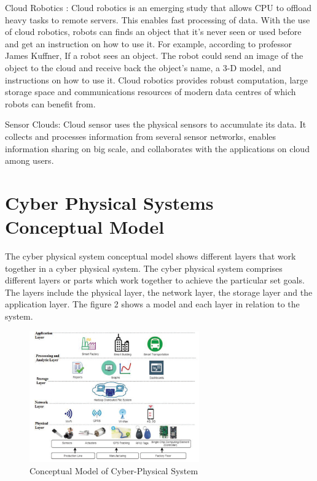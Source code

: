 \documentclass[english]{lni}
\begin{document}
Cloud Robotics : Cloud robotics is an emerging study that allows CPU to offload heavy tasks to remote servers. This enables fast processing of data. With the use of cloud robotics, robots can finds an object that it's never seen or used before and get an instruction on how to use it. For example, according to professor James Kuffner, If a robot sees an object. The robot could send an image of the object to the cloud and receive back the object’s name, a 3-D model, and instructions on how to use it. Cloud robotics provides robust computation, large storage space and communications resources of modern data centres of which robots can benefit from. \cite{copyurl1}

Sensor Clouds:
Cloud sensor uses the physical sensors to accumulate its data. It collects and processes information from several sensor networks, enables information sharing on big scale, 
and collaborates with the applications on cloud among users.\cite{copyurl2}

\section{Cyber Physical Systems Conceptual Model}
The cyber physical system conceptual model shows different layers that work together in a cyber physical system. The cyber physical system  comprises different layers  or parts which work together to achieve the particular set goals. The layers include the physical layer, the network layer, the storage layer and the application layer. The figure 2 shows a model and each layer in relation to the system.

\begin{figure}[h]
    \centering
    \includegraphics[width=0.65\textwidth]{Images/conceptmodel.png}
    \caption{Conceptual Model of Cyber-Physical System \cite{image2}}
    \label{fig:conceptmodel}
\end{figure}
\end{document}
